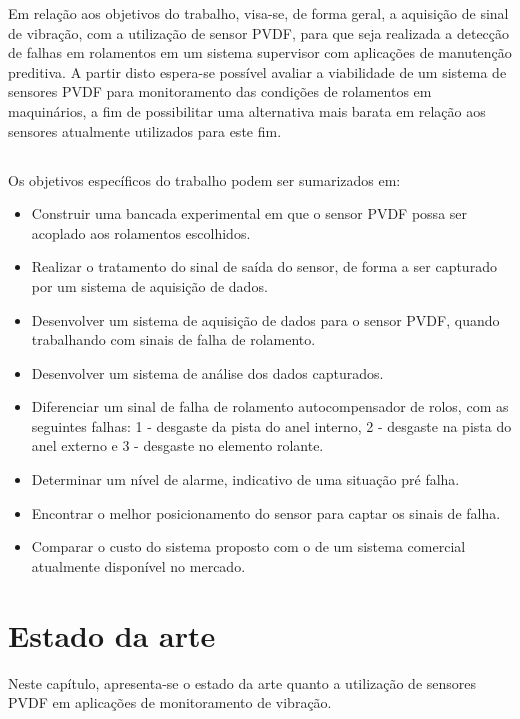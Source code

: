 \documentclass[
	12pt,				
	oneside,			
	a4paper,			
	english,			
	brazil,			
	]{abntex2ppgsi}
\begin{document}
Em relação aos objetivos do trabalho, visa-se, de forma geral, a aquisição de sinal de vibração, com a utilização de sensor PVDF, para que seja realizada a detecção de falhas em rolamentos em um sistema supervisor com aplicações de manutenção preditiva. A partir disto espera-se possível avaliar a viabilidade de um sistema de sensores PVDF para monitoramento das condições de rolamentos em maquinários, a fim de possibilitar uma alternativa mais barata em relação aos sensores atualmente utilizados para este fim.

\section{}

Os objetivos específicos do trabalho podem ser sumarizados em:

\begin{itemize}
	\item Construir uma bancada experimental em que o sensor PVDF possa ser acoplado aos rolamentos escolhidos.
	\item Realizar o tratamento do sinal de saída do sensor, de forma a ser capturado por um sistema de aquisição de dados.
	\item Desenvolver um sistema de aquisição de dados para o sensor PVDF, quando trabalhando com sinais de falha de rolamento.
	\item Desenvolver um sistema de análise dos dados capturados.
	\item Diferenciar um sinal de falha de rolamento autocompensador de rolos, com as seguintes falhas: 1 - desgaste da pista do anel interno, 2 - desgaste na pista do anel externo e 3 - desgaste no elemento rolante.
	\item Determinar um nível de alarme, indicativo de uma situação pré falha.
	\item Encontrar o melhor posicionamento do sensor para captar os sinais de falha.
	\item Comparar o custo do sistema proposto com o de um sistema comercial atualmente disponível no mercado.
\end{itemize}

\newpage
\chapter{\textbf{Estado da arte}}

Neste capítulo, apresenta-se o estado da arte quanto a utilização de sensores PVDF em aplicações de monitoramento de vibração.
\end{document}
